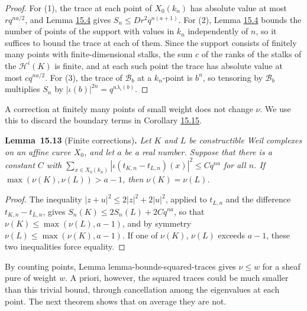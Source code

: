 \documentclass[11pt]{article}
\newenvironment{bpstatement}[2]{\par\addvspace{0.6\baselineskip}\noindent\textbf{#1}#2\textbf{.}\enspace\ignorespaces}
  {\par\addvspace{0.4\baselineskip}}
\newenvironment{bpstatementit}[2]{\begin{bpstatement}{#1}{#2}\itshape\ignorespaces}{\end{bpstatement}}
\begin{document}
\begin{proof}[{Proof}]\label{bp157}%
For (1), the trace at each point of \(X_0(k_n)\) has absolute value at most \(rq^{na/2}\), and Lemma \hyperref[bp131]{15.4} gives \(S_n\le Dr^2q^{n(a+1)}\). For (2), Lemma \hyperref[bp131]{15.4} bounds the number of points of the support with values in \(k_n\) independently of \(n\), so it suffices to bound the trace at each of them. Since the support consists of finitely many points with finite-dimensional stalks, the sum \(c\) of the ranks of the stalks of the \(\mathcal H^i(K)\) is finite, and at each such point the trace has absolute value at most \(cq^{na/2}\). For (3), the trace of \(\mathcal B_b\) at a \(k_n\)-point is \(b^n\), so tensoring by \(\mathcal B_b\) multiplies \(S_n\) by \(|\iota(b)|^{2n}=q^{n\lambda_\iota(b)}\).
\end{proof}

\label{bp158}%
A correction at finitely many points of small weight does not change \(\nu\). We use this to discard the boundary terms in Corollary \hyperref[bp165]{15.15}.

\label{bp159}%
\begin{bpstatementit}{Lemma~15.13}{ (Finite corrections)}
Let \(K\) and \(L\) be constructible Weil complexes on an affine curve \(X_0\), and let \(a\) be a real number. Suppose that there is a constant \(C\) with \(\sum_{x\in X_0(k_n)}|\iota(t_{K,n}-t_{L,n})(x)|^2\le Cq^{na}\) for all \(n\). If \(\max(\nu(K),\nu(L))>a-1\), then \(\nu(K)=\nu(L)\).
\end{bpstatementit}

\begin{proof}[{Proof}]\label{bp160}%
The inequality \(|z+u|^2\le2|z|^2+2|u|^2\), applied to \(t_{L,n}\) and the difference \(t_{K,n}-t_{L,n}\), gives \(S_n(K)\le2S_n(L)+2Cq^{na}\), so that \(\nu(K)\le\max(\nu(L),a-1)\), and by symmetry \(\nu(L)\le\max(\nu(K),a-1)\).  If one of \(\nu(K)\), \(\nu(L)\) exceeds \(a-1\), these two inequalities force equality.
\end{proof}

\label{bp161}%
By counting points, Lemma lemma-bounds-squared-traces gives \(\nu\le w\) for a sheaf pure of weight \(w\). A priori, however, the squared traces could be much smaller than this trivial bound, through cancellation among the eigenvalues at each point. The next theorem shows that on average they are not.
\end{document}
